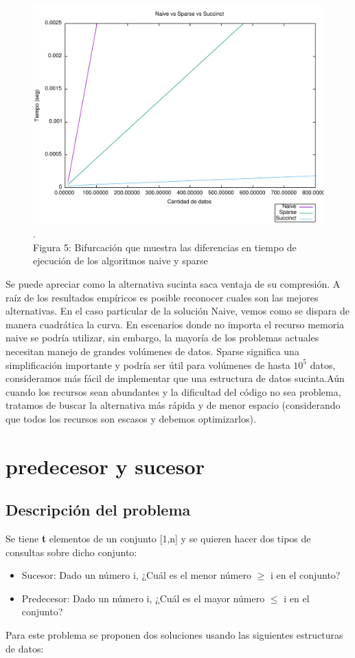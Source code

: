 \documentclass[11pt]{article}
\begin{document}
\begin{center}\begin{figure}[htp]
\centering
\includegraphics[scale=0.6]{grafico.pdf}
\\\scriptsize{\color{white}.\color{black}\\Figura 5: Bifurcación que muestra las diferencias en tiempo de ejecución de los algoritmos naive y sparse}
\label{etiqueta}
\end{figure}
\end{center}
Se puede apreciar como la alternativa sucinta saca ventaja de su compresión. A raíz de los resultados empíricos es posible reconocer cuales son las mejores alternativas. En el caso particular de la solución Naive, vemos como se dispara de manera cuadrática la curva. En escenarios donde no importa el recurso memoria naive se podría utilizar, sin embargo, la mayoría de los problemas actuales necesitan manejo de grandes volúmenes de datos. Sparse significa una simplificación importante y podría ser útil para volúmenes de hasta $10^5$ datos, consideramos más fácil de implementar que una estructura de datos sucinta.Aún cuando los recursos sean abundantes y la dificultad del código no sea problema, tratamos de buscar la alternativa más rápida y de menor espacio (considerando que todos los recursos son escasos y debemos optimizarlos).
\section{predecesor y sucesor}
\subsection{Descripción del problema}
Se tiene \textbf{t} elementos de un conjunto [1,n] y se quieren hacer dos tipos de consultas sobre dicho conjunto:
\begin{itemize}
\item Sucesor: Dado un número i, ¿Cuál es el menor número $\geq$ i en el conjunto?
\item Predecesor: Dado un número i, ¿Cuál es el mayor número $\leq$ i en el conjunto?
\end{itemize}
Para este problema se proponen dos soluciones usando las siguientes estructuras de datos:
\end{document}
